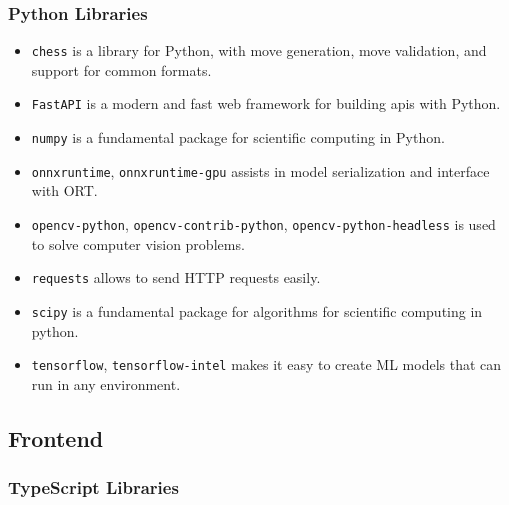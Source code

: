 \subsubsection*{Python Libraries}

\begin{itemize}
    \item \texttt{chess} is a library for Python, with move generation, move validation, and support for common formats. \cite{python:chess}
    
    \item \texttt{FastAPI} is a modern and fast web framework for building \Glspl{api} with Python. \cite{python:fastapi}
    
    \item \texttt{numpy} is a fundamental package for scientific computing in Python. \cite{python:numpy}
    
    \item \texttt{onnxruntime}, \texttt{onnxruntime-gpu} assists in model serialization and interface with ORT. \cite{python:onnx}
    
    \item \texttt{opencv-python}, \texttt{opencv-contrib-python}, \texttt{opencv-python-headless} is used to solve computer vision problems. \cite{python:opencv}
    
    \item \texttt{requests} allows to send HTTP requests easily. \cite{python:requests}
    
    \item \texttt{scipy} is a fundamental package for algorithms for scientific computing in python. \cite{python:scipy}
    
    \item \texttt{tensorflow}, \texttt{tensorflow-intel} makes it easy to create ML models that can run in any environment. \cite{python:tensorflow}
\end{itemize}

\subsection{Frontend}
\subsubsection*{TypeScript Libraries}

